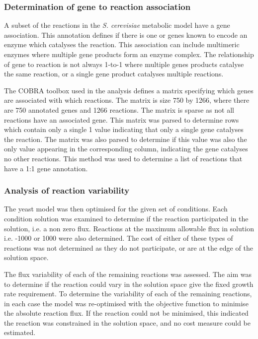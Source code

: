 \subsubsection{Determination of gene to reaction association}

A subset of the reactions in the \emph{S. cerevisiae} metabolic model have a gene association. This annotation defines if there is one or genes known to encode an enzyme which catalyses the reaction. This association can include multimeric enzymes where multiple gene products form an enzyme complex. The relationship of gene to reaction is not always 1-to-1 where multiple genes products catalyse the same reaction, or a single gene product catalyses multiple reactions. 

The COBRA toolbox used in the analysis defines a matrix specifying which genes are associated with which reactions. The matrix is size 750 by 1266, where there are 750 annotated genes and 1266 reactions. The matrix is sparse as not all reactions have an associated gene. This matrix was parsed to determine rows which contain only a single 1 value indicating that only a single gene catalyses the reaction. The matrix was also parsed to determine if this value was also the only value appearing in the corresponding column, indicating the gene catalyses no other reactions. This method was used to determine a list of reactions that have a 1:1 gene annotation.

\subsubsection{Analysis of reaction variability}

The yeast model was then optimised for the given set of conditions. Each condition solution was examined to determine if the reaction participated in the solution, i.e. a non zero flux. Reactions at the maximum allowable flux in solution i.e. -1000 or 1000 were also determined. The cost of either of these types of reactions was not determined as they do not participate, or are at the edge of the solution space.

The flux variability of each of the remaining reactions was assessed. The aim was to determine if the reaction could vary in the solution space give the fixed growth rate requirement. To determine the variability of each of the remaining reactions, in each case the model was re-optimised with the objective function to minimise the absolute reaction flux. If the reaction could not be minimised, this indicated the reaction was constrained in the solution space, and no cost measure could be estimated.

